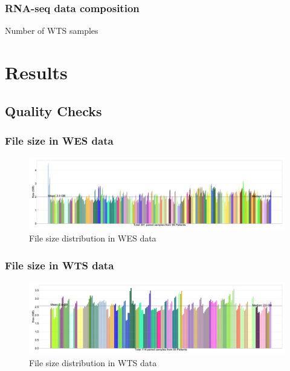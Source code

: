 \documentclass{beamer}
\begin{document}
        \begin{frame}
            \frametitle{RNA-seq data composition}

            \begin{table}
                \caption{Number of WTS samples}
                
            \end{table}
        \end{frame}

    \section{Results}
        \subsection{Quality Checks}
            \begin{frame}
                \frametitle{File size in WES data}

                \begin{figure}
                    \includegraphics[width=0.9 \linewidth]{figures/Size/WES.pdf}
                    \caption{File size distribution in WES data}
                \end{figure}
            \end{frame}

            \begin{frame}
                \frametitle{File size in WTS data}

                \begin{figure}
                    \includegraphics[width=0.9 \linewidth]{figures/Size/WTS.pdf}
                    \caption{File size distribution in WTS data}
                \end{figure}
            \end{frame}
\end{document}
